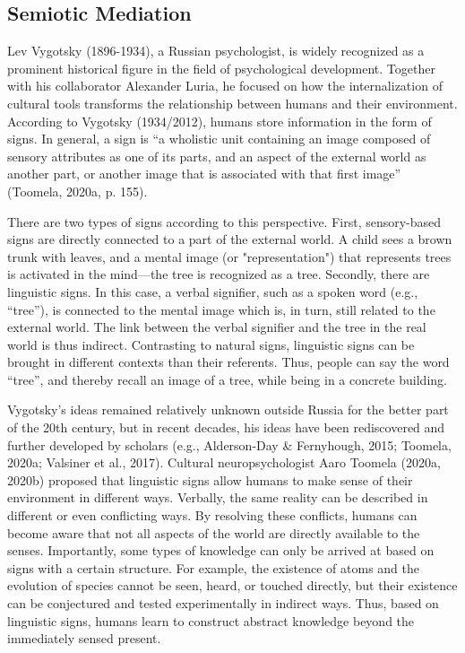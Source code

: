 \documentclass[authordate, reflection, issue]{jote-new-article}
\begin{document}
	\subsection{Semiotic Mediation}



	Lev Vygotsky (1896-1934), a Russian psychologist, is widely recognized as a prominent historical figure in the field of psychological development. Together with his collaborator Alexander Luria, he focused on how the internalization of cultural tools transforms the relationship between humans and their environment. According to Vygotsky (1934/2012), humans store information in the form of signs. In general, a sign is “a wholistic unit containing an image composed of sensory attributes as one of its parts, and an aspect of the external world as another part, or another image that is associated with that first image” (Toomela, 2020a, p. 155).



	There are two types of signs according to this perspective. First, sensory-based signs are directly connected to a part of the external world. A child sees a brown trunk with leaves, and a mental image (or "representation") that represents trees is activated in the mind—the tree is recognized as a tree. Secondly, there are linguistic signs. In this case, a verbal signifier, such as a spoken word (e.g., “tree”), is connected to the mental image which is, in turn, still related to the external world. The link between the verbal signifier and the tree in the real world is thus indirect. Contrasting to natural signs, linguistic signs can be brought in different contexts than their referents. Thus, people can say the word “tree”, and thereby recall an image of a tree, while being in a concrete building.



	Vygotsky's ideas remained relatively unknown outside Russia for the better part of the 20th century, but in recent decades, his ideas have been rediscovered and further developed by scholars (e.g., Alderson-Day \& Fernyhough, 2015; Toomela, 2020a; Valsiner et al., 2017). Cultural neuropsychologist Aaro Toomela (2020a, 2020b) proposed that linguistic signs allow humans to make sense of their environment in different ways. Verbally, the same reality can be described in different or even conflicting ways. By resolving these conflicts, humans can become aware that not all aspects of the world are directly available to the senses. Importantly, some types of knowledge can only be arrived at based on signs with a certain structure. For example, the existence of atoms and the evolution of species cannot be seen, heard, or touched directly, but their existence can be conjectured and tested experimentally in indirect ways. Thus, based on linguistic signs, humans learn to construct abstract knowledge beyond the immediately sensed present.
\end{document}
